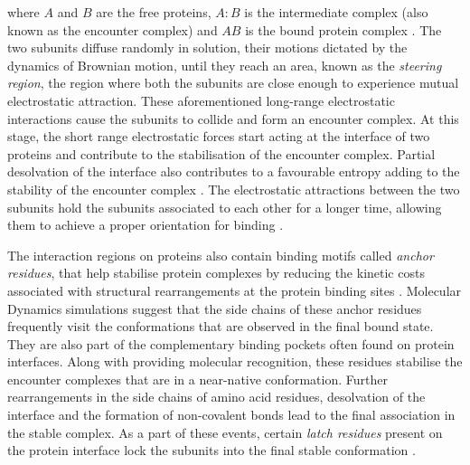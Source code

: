 where $A$ and $B$ are the free proteins, $A:B$ is the intermediate complex (also known as the encounter complex) and $AB$ is the bound protein complex \citep{Selzer2001}. The two subunits diffuse randomly in solution, their motions dictated by the dynamics of Brownian motion, until they reach an area, known as the \textit{steering region}, the region where both the subunits are close enough to experience mutual electrostatic attraction. These aforementioned long-range electrostatic interactions cause the subunits to collide and form an encounter complex. At this stage, the short range electrostatic forces start acting at the interface of two proteins and contribute to the stabilisation of the encounter complex. Partial desolvation of the interface also contributes to a favourable entropy adding to the stability of the encounter complex \citep{Ross1981}. The electrostatic attractions between the two subunits hold the subunits associated to each other for a longer time, allowing them to achieve a proper orientation for binding \citep{Sheinerman2000}.

\par
The interaction regions on proteins also contain binding motifs called \textit{anchor residues}, that help stabilise protein complexes by reducing the kinetic costs associated with structural rearrangements at the protein binding sites \citep{Rajamani2004}. Molecular Dynamics simulations suggest that the side chains of these anchor residues frequently visit the conformations that are observed in the final bound state. They are also part of the complementary binding pockets often found on protein interfaces. Along with providing molecular recognition, these residues stabilise the encounter complexes that are in a near-native conformation. Further rearrangements in the side chains of amino acid residues, desolvation of the interface and the formation of non-covalent bonds lead to the final association in the stable complex. As a part of these events, certain \textit{latch residues} present on the protein interface lock the subunits into the final stable conformation \citep{Rajamani2004}.

